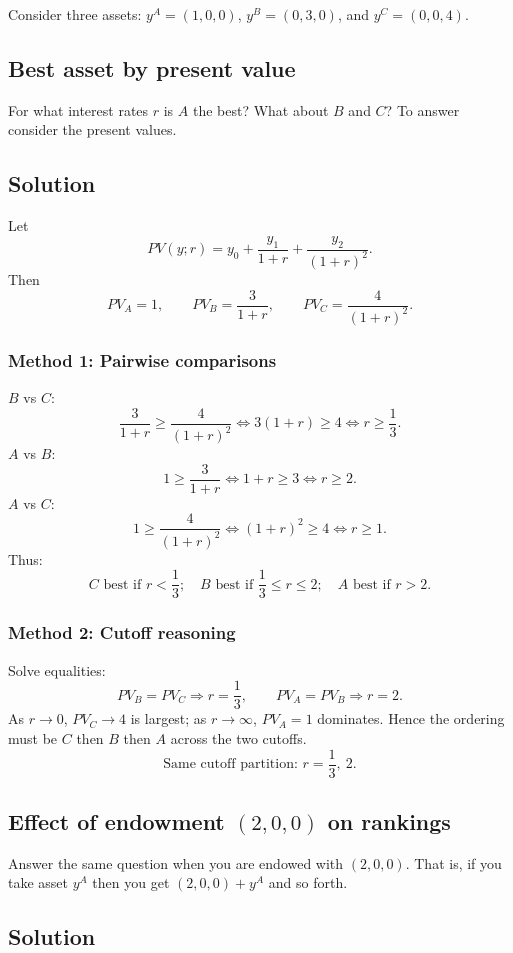 \documentclass[12pt]{article}
\begin{document}
Consider three assets: \(y^{A}=(1,0,0)\), \(y^{B}=(0,3,0)\), and \(y^{C}=(0,0,4)\).

\subsection{Best asset by present value}
For what interest rates \(r\) is \(A\) the best? What about \(B\) and \(C\)? To answer consider the
present values.

\subsection*{Solution}
Let
\[
PV(y;r)=y_0+\frac{y_1}{1+r}+\frac{y_2}{(1+r)^2}.
\]
Then
\[
PV_A=1,\qquad PV_B=\frac{3}{1+r},\qquad PV_C=\frac{4}{(1+r)^2}.
\]

\subsubsection*{Method 1: Pairwise comparisons}
\(B\) vs \(C\):
\[
\frac{3}{1+r}\ge \frac{4}{(1+r)^2}
\iff 3(1+r)\ge 4
\iff r\ge \frac{1}{3}.
\]
\(A\) vs \(B\):
\[
1\ge \frac{3}{1+r}\iff 1+r\ge 3\iff r\ge 2.
\]
\(A\) vs \(C\):
\[
1\ge \frac{4}{(1+r)^2}\iff (1+r)^2\ge 4\iff r\ge 1.
\]
Thus:
\[
\boxed{\;\text{\(C\) best if }r<\frac13;\quad \text{\(B\) best if }\frac13\le r\le 2;\quad \text{\(A\) best if }r>2.\;}
\]

\subsubsection*{Method 2: Cutoff reasoning}
Solve equalities:
\[
PV_B=PV_C \Rightarrow r=\frac13,\qquad PV_A=PV_B\Rightarrow r=2.
\]
As \(r\to 0\), \(PV_C\to 4\) is largest; as \(r\to\infty\), \(PV_A=1\) dominates. Hence the ordering must be \(C\) then \(B\) then \(A\) across the two cutoffs.
\[
\boxed{\;\text{Same cutoff partition: }r=\frac13,\ 2.\;}
\]

\newpage
\subsection{Effect of endowment \((2,0,0)\) on rankings}
Answer the same question when you are endowed with \((2,0,0)\). That is, if you take
asset \(y^{A}\) then you get \((2,0,0)+y^{A}\) and so forth.

\subsection*{Solution}
\end{document}

